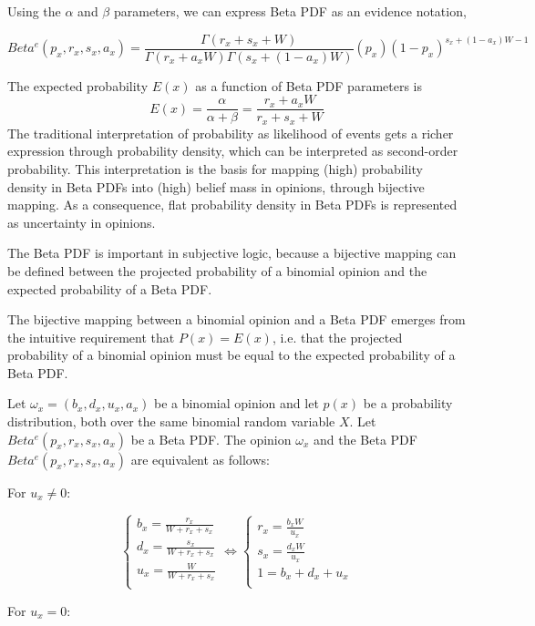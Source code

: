 \documentclass[UTF8]{article}
\newcommand{\opinion}[5]{$\omega_{#1} = (#2, #3, #4, #5)$}
\begin{document}
Using the $\alpha$ and $\beta$ parameters, we can express Beta PDF as an evidence notation,

$$
Beta^e(p_x, r_x, s_x, a_x) = \frac{\Gamma(r_x + s_x + W)}{\Gamma(r_x + a_xW) \Gamma(s_x + (1 - a_x)W)}\left(p_x\right)\left(1 - p_x\right)^{s_x + (1 - a_x)W - 1}
$$

The expected probability $E(x)$ as a function of Beta PDF parameters is 
$$
E(x) = \frac{\alpha}{\alpha + \beta} = \frac{r_x + a_xW}{r_x + s_x + W}
$$
The traditional interpretation of probability
as likelihood of events gets a richer expression through probability density, which
can be interpreted as second-order probability. This interpretation is the basis for
mapping (high) probability density in Beta PDFs into (high) belief mass in opinions, through bijective mapping. As a consequence, flat probability density in Beta PDFs is represented as uncertainty in opinions.

The Beta PDF is important in subjective logic, because a bijective mapping can
be defined between the projected probability of a binomial opinion and the expected
probability of a Beta PDF.

The bijective mapping between a binomial opinion and a Beta PDF emerges from
the intuitive requirement that $P(x) = E(x)$, i.e. that the projected probability of a
binomial opinion must be equal to the expected probability of a Beta PDF.

Let \opinion{x}{b_x}{d_x}{u_x}{a_x} be a binomial opinion and let $p(x)$ be a probability distribution, both over the same binomial random variable $X$. Let $Beta^e(p_x, r_x, s_x, a_x)$ be a Beta PDF. The opinion $\omega_x$ and the Beta PDF $Beta^e(p_x, r_x, s_x, a_x)$ are equivalent as follows:

For $u_x \neq 0$:

$$
\begin{cases}
    b_x = \frac{r_x}{W + r_x + s_x}\\
    d_x = \frac{s_x}{W + r_x + s_x}\\
    u_x = \frac{W}{W + r_x + s_x}\\
\end{cases}
\Leftrightarrow
\begin{cases}
    r_x = \frac{b_xW}{u_x}\\
    s_x = \frac{d_xW}{u_x}\\
    1 = b_x + d_x + u_x\\
\end{cases}
$$

For $u_x = 0$:
\end{document}
